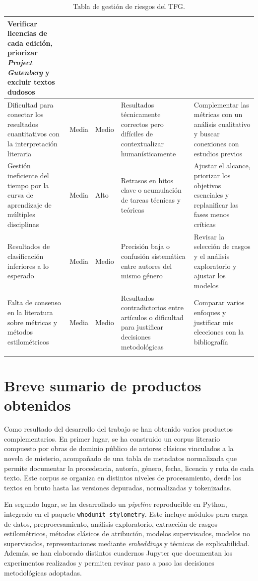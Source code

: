 \documentclass[IB]{TFUOC}%
\begin{document}
{\begin{longtable}{|p{3.5cm}|p{2.5cm}|p{1.6cm}|p{3.6cm}|p{3.6cm}|}
Verificar licencias de cada edición, priorizar \textit{Project Gutenberg} y excluir textos dudosos \\
\hline
Dificultad para conectar los resultados cuantitativos con la interpretación literaria &
Media &
Medio &
Resultados técnicamente correctos pero difíciles de contextualizar humanísticamente &
Complementar las métricas con un análisis cualitativo y buscar conexiones con estudios previos \\
\hline
Gestión ineficiente del tiempo por la curva de aprendizaje de múltiples disciplinas &
Media &
Alto &
Retrasos en hitos clave o acumulación de tareas técnicas y teóricas &
Ajustar el alcance, priorizar los objetivos esenciales y replanificar las fases menos críticas \\
\hline
Resultados de clasificación inferiores a lo esperado &
Media &
Medio &
Precisión baja o confusión sistemática entre autores del mismo género &
Revisar la selección de rasgos y el análisis exploratorio y ajustar los modelos \\
\hline
Falta de consenso en la literatura sobre métricas y métodos estilométricos &
Media &
Medio &
Resultados contradictorios entre artículos o dificultad para justificar decisiones metodológicas &
Comparar varios enfoques y justificar mis elecciones con la bibliografía \\
\hline
\caption{Tabla de gestión de riesgos del TFG.}
\label{tab:gestion_riesgos_tfg}
\end{longtable}
}
\section{Breve sumario de productos obtenidos}

Como resultado del desarrollo del trabajo se han obtenido varios productos complementarios. En primer lugar, se ha construido un corpus literario compuesto por obras de dominio público de autores clásicos vinculados a la novela de misterio, acompañado de una tabla de metadatos normalizada que permite documentar la procedencia, autoría, género, fecha, licencia y ruta de cada texto. Este corpus se organiza en distintos niveles de procesamiento, desde los textos en bruto hasta las versiones depuradas, normalizadas y tokenizadas.

En segundo lugar, se ha desarrollado un \textit{pipeline} reproducible en Python, integrado en el paquete \texttt{whodunit\_stylometry}. Este incluye módulos para carga de datos, preprocesamiento, análisis exploratorio, extracción de rasgos estilométricos, métodos clásicos de atribución, modelos supervisados, modelos no supervisados, representaciones mediante \textit{embeddings} y técnicas de explicabilidad. Además, se han elaborado distintos cuadernos Jupyter que documentan los experimentos realizados y permiten revisar paso a paso las decisiones metodológicas adoptadas.
\end{document}
